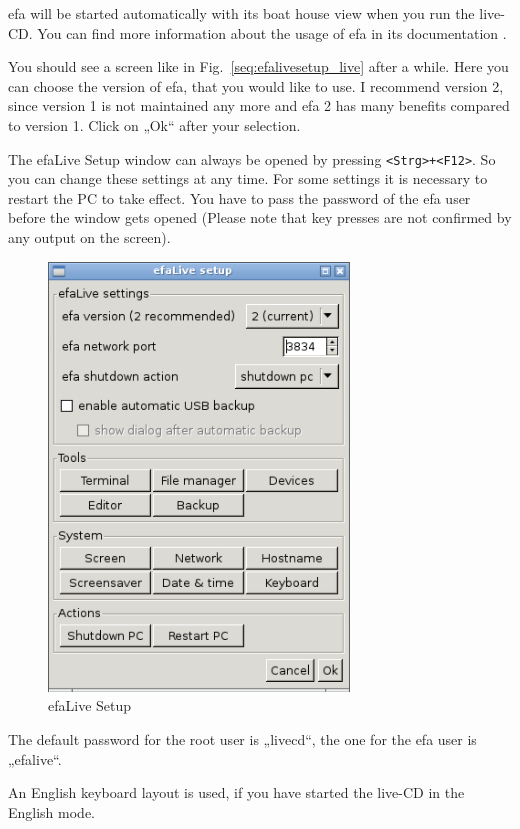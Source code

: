 \documentclass[a4paper,12pt,twoside]{article}
\begin{document}
efa will be started automatically with its boat house view when you run
the live-CD. You can find more information about the usage of efa in
its documentation \cite{EFA2}.

You should see a screen like in Fig.~\ref{seq:efalivesetup_live} after a while.
Here you can choose the version of efa, that you would like to use. I
recommend version 2, since version 1 is not maintained any more and efa
2 has many benefits compared to version 1. Click on „Ok“ after your
selection.

The efaLive Setup window can always be opened by pressing
\texttt{{\textless}Strg{\textgreater}+{\textless}F12{\textgreater}}. So you can
change these settings at any time. For some settings it is necessary to
restart the PC to take effect. You have to pass the password of the efa
user before the window gets opened (Please note that key presses are
not confirmed by any output on the screen).

\begin{figure}
    \centering
    \includegraphics[width=8cm]{efaLiveen-img/efaLiveen-img3.png}
    \caption{efaLive Setup}
    \label{fig:efalivesetup_live}
\end{figure}

The default password for the root user is „livecd“, the one for the efa
user is „efalive“.

An English keyboard layout is used, if you have started the live-CD in
the English mode.
\end{document}
